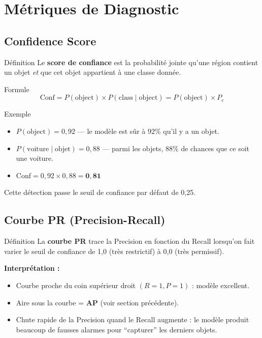 \documentclass[12pt, a4paper]{report}
\begin{document}
\chapter{Métriques de Diagnostic}

\section{Confidence Score}

\begin{definitionbox}{Définition}
  Le \textbf{score de confiance} est la probabilité jointe qu'une région contient
  un objet \emph{et} que cet objet appartient à une classe donnée.
\end{definitionbox}

\begin{formulebox}{Formule}
  \[
    \text{Conf} = P(\text{object}) \times P(\text{class} \mid \text{object})
                = P(\text{object}) \times P_c
  \]
\end{formulebox}

\begin{examplebox}{Exemple}
  \begin{itemize}
    \item $P(\text{object}) = 0{,}92$ — le modèle est sûr à 92\% qu'il y a un objet.
    \item $P(\text{voiture} \mid \text{objet}) = 0{,}88$ — parmi les objets, 88\%
          de chances que ce soit une voiture.
    \item $\text{Conf} = 0{,}92 \times 0{,}88 = \mathbf{0{,}81}$
  \end{itemize}
  Cette détection passe le seuil de confiance par défaut de 0{,}25.
\end{examplebox}

\section{Courbe PR (Precision-Recall)}

\begin{definitionbox}{Définition}
  La \textbf{courbe PR} trace la Precision en fonction du Recall lorsqu'on fait
  varier le seuil de confiance de 1{,}0 (très restrictif) à 0{,}0 (très permissif).
\end{definitionbox}

\textbf{Interprétation :}
\begin{itemize}
  \item Courbe proche du coin supérieur droit $(R=1, P=1)$ : modèle excellent.
  \item Aire sous la courbe = \textbf{AP} (voir section précédente).
  \item Chute rapide de la Precision quand le Recall augmente : le modèle produit
        beaucoup de fausses alarmes pour ``capturer'' les derniers objets.
\end{itemize}
\end{document}
